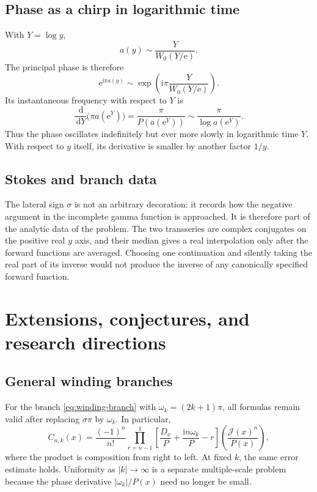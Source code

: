 \documentclass[11pt,a4paper]{article}
\numberwithin{equation}{section}
\theoremstyle{definition}
\theoremstyle{remark}
\newcommand{\e}{\mathrm e}
\newcommand{\ii}{\mathrm i}
\newcommand{\dd}{\,\mathrm d}
\newcommand{\Tail}{\mathcal J}
\begin{document}
\subsection{Phase as a chirp in logarithmic time}

With $Y=\log y$,
\begin{equation}\label{eq:a-Y-leading}
 a(y)\sim\frac{Y}{W_0(Y/\e)}.
\end{equation}
The principal phase is therefore
\begin{equation}\label{eq:chirp-phase}
 \e^{\ii\pi a(y)}
 \sim\exp\left(
 \ii\pi\frac{Y}{W_0(Y/\e)}
 \right).
\end{equation}
Its instantaneous frequency with respect to $Y$ is
\begin{equation}\label{eq:chirp-frequency}
 \frac{\dd}{\dd Y}\bigl(\pi a(\e^Y)\bigr)
 =\frac{\pi}{P(a(\e^Y))}
 \sim\frac{\pi}{\log a(\e^Y)}.
\end{equation}
Thus the phase oscillates indefinitely but ever more slowly in logarithmic
time $Y$.  With respect to $y$ itself, its derivative is smaller by another
factor $1/y$.

\subsection{Stokes and branch data}

The lateral sign $\sigma$ is not an arbitrary decoration: it records how the
negative argument in the incomplete gamma function is approached.  It is
therefore part of the analytic data of the problem.  The two transseries are
complex conjugates on the positive real $y$ axis, and their median gives a
real interpolation only after the forward functions are averaged.  Choosing
one continuation and silently taking the real part of its inverse would not
produce the inverse of any canonically specified forward function.

\section{Extensions, conjectures, and research directions}
\label{sec:extensions}

\subsection{General winding branches}

For the branch \eqref{eq:winding-branch} with
$\omega_k=(2k+1)\pi$, all formulas remain valid after replacing
$\sigma\pi$ by $\omega_k$.  In particular,
\begin{equation}\label{eq:Cn-k}
 C_{n,k}(x)=\frac{(-1)^n}{n!}
 \prod_{r=n-1}^{1}
 \left[
 \frac{D_x}{P}+\frac{\ii n\omega_k}{P}-r
 \right]
 \left(\frac{\Tail(x)^n}{P(x)}\right),
\end{equation}
where the product is composition from right to left.  At fixed $k$, the
same error estimate holds.  Uniformity as $|k|\to\infty$ is a separate
multiple-scale problem because the phase derivative
$|\omega_k|/P(x)$ need no longer be small.
\end{document}
